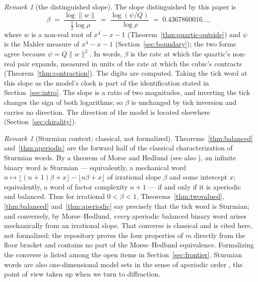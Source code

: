 \documentclass[11pt]{amsart}
\theoremstyle{plain}
\theoremstyle{definition}
\theoremstyle{remark}
\newtheorem{remark}[theorem]{Remark}
\begin{document}
\begin{remark}[the distinguished slope]\label{rem:beta}
The slope distinguished by this paper is
\[
  \beta \;=\; \frac{\log \lVert w \rVert}{\tfrac12 \log \rho} \;=\; \frac{\log(\psi/Q)}{\log \rho} \;=\; 0.4367860016\ldots,
\]
where $w$ is a non-real root of $x^4 - x - 1$ (Theorem~\ref{thm:quartic-outside}) and $\psi$ is the Mahler measure of $x^4 - x - 1$ (Section~\ref{sec:boundary}); the two forms agree because $\psi = Q \lVert w \rVert^2$. In words, $\beta$ is the rate at which the quartic's non-real pair expands, measured in units of the rate at which the cubic's contracts (Theorem~\ref{thm:contraction}). The digits are computed.  Taking the tick word at this slope as the model's clock is part of the identification stated in Section~\ref{sec:intro}.{} The slope is a ratio of two magnitudes, and inverting the tick changes the sign of both logarithms; so $\beta$ is unchanged by tick inversion and carries no direction. The direction of the model is located elsewhere (Section~\ref{sec:chirality}).
\end{remark}

\begin{remark}[Sturmian context; classical, not formalized]\label{rem:sturmian}
Theorems~\ref{thm:balanced} and~\ref{thm:aperiodic} are the forward half of the classical characterization of Sturmian words. By a theorem of Morse and Hedlund \cite{morsehedlund1940} (see also \cite[Ch.~2]{lothaire2002}), an infinite binary word is Sturmian --- equivalently, a mechanical word $n \mapsto \lfloor (n+1)\beta + x \rfloor - \lfloor n\beta + x \rfloor$ of irrational slope $\beta$ and some intercept $x$; equivalently, a word of factor complexity $n + 1$ --- if and only if it is aperiodic and balanced. Thus for irrational $0 < \beta < 1$, Theorems~\ref{thm:twovalued}, \ref{thm:balanced} and~\ref{thm:aperiodic} say precisely that the tick word is Sturmian; and conversely, by Morse--Hedlund, \emph{every} aperiodic balanced binary word arises mechanically from an irrational slope. That converse is classical and is cited here, not formalized: the repository proves the four properties of $m$ directly from the floor bracket and contains no part of the Morse--Hedlund equivalence. Formalizing the converse is listed among the open items in Section~\ref{sec:frontier}. Sturmian words are also one-dimensional model sets in the sense of aperiodic order \cite{baakegrimm2013}, the point of view taken up when we turn to diffraction.
\end{remark}
\end{document}
